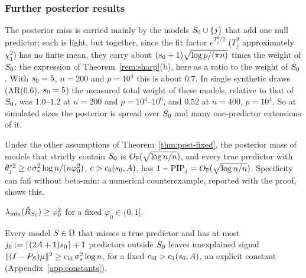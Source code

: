 \subsubsection{Further posterior results}

\begin{remark}\label{rem:moderate-n}
The posterior miss is carried mainly by the models
$S_0\cup\{j\}$ that add one null predictor; each is light, but together, since the fit factor $e^{T_j^2/2}$ ($T_j^2$
approximately $\chi^2_1$) has no finite mean, they carry about $(s_0+1)\sqrt{\log p/(\pi n)}$ times the weight of $S_0$:
the expression of Theorem~\ref{rem:sharp}(b), here as a ratio to the weight of $S_0$. With $s_0=5$, $n=200$ and $p=10^4$ this is about $0.7$. In single
synthetic draws (AR(0.6), $s_0=5$) the measured total weight of these models, relative to that of $S_0$, was $1.0$--$1.2$
at $n=200$ and $p=10^4$--$10^6$, and $0.52$ at $n=400$, $p=10^4$. So at simulated sizes the posterior is spread over $S_0$
and many one-predictor extensions of it.
\end{remark}


\begin{remark}\label{rem:no-betamin}
Under the other assumptions of Theorem~\ref{thm:post-fixed}, the posterior mass of models that strictly contain $S_0$ is
$O_{\mathbb{P}}(\sqrt{\log n/n})$, and every true predictor with $\theta_j^{*2}\ge c\,\sigma_*^2\log n/(n\varphi_0^2)$, $c>c_0(s_0,A)$, has
$1-\mathrm{PIP}_j=O_{\mathbb{P}}(\sqrt{\log n/n})$. Specificity can fail without beta-min: a numerical counterexample, reported with the proof, shows this.
\end{remark}



\begin{localassumption}\label{asm:margin}
\begin{asmitems}
  \item $\lambda_{\min}(\hat R_{S_0})\ge\varphi_0^2$ for a fixed $\varphi_0\in(0,1]$.
  \item Every model $S\in\Omega$ that misses a true predictor and has at most $j_0:=\lceil(2A+1)s_0\rceil+1$ predictors
    outside $S_0$ leaves unexplained signal $\lVert (I-P_S)\mu\rVert^2\ge c_{\mathrm{id}}\,\sigma_*^2\log n$, for a fixed
    $c_{\mathrm{id}}>c_1(s_0,A)$, an explicit constant (Appendix~\ref{app:constants}).
\end{asmitems}
\end{localassumption}

